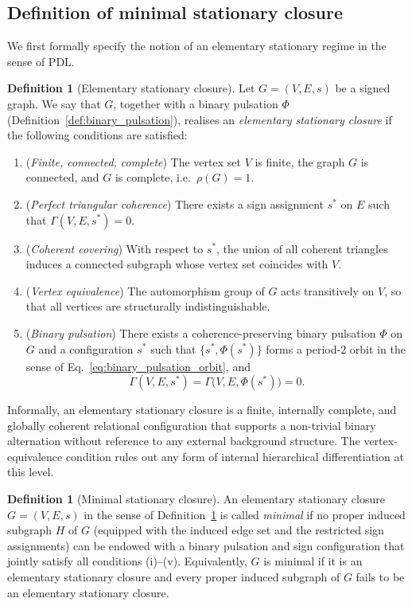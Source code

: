 \documentclass[11pt,a4paper]{article}
\theoremstyle{definition}
\newtheorem{definition}[theorem]{Definition}
\begin{document}
\subsection{Definition of minimal stationary closure}

We first formally specify the notion of an elementary stationary regime in the sense of PDL.\cite{PDL_Intro_2026,PDL_Main_2026,PDL_TO_Dialogue_2026}

\begin{definition}[Elementary stationary closure]
\label{def:stationary_closure}
Let $G=(V,E,s)$ be a signed graph. We say that $G$, together with a binary pulsation $\Phi$ (Definition~\ref{def:binary_pulsation}), realises an \emph{elementary stationary closure} if the following conditions are satisfied:
\begin{enumerate}
  \item[(i)] (\emph{Finite, connected, complete}) The vertex set $V$ is finite, the graph $G$ is connected, and $G$ is complete, i.e.\ $\rho(G)=1$.
  \item[(ii)] (\emph{Perfect triangular coherence}) There exists a sign assignment $s^\ast$ on $E$ such that $\Gamma(V,E,s^\ast)=0$.
  \item[(iii)] (\emph{Coherent covering}) With respect to $s^\ast$, the union of all coherent triangles induces a connected subgraph whose vertex set coincides with $V$.
  \item[(iv)] (\emph{Vertex equivalence}) The automorphism group of $G$ acts transitively on $V$, so that all vertices are structurally indistinguishable.
  \item[(v)] (\emph{Binary pulsation}) There exists a coherence-preserving binary pulsation $\Phi$ on $G$ and a configuration $s^\ast$ such that $\{s^\ast,\Phi(s^\ast)\}$ forms a period-$2$ orbit in the sense of Eq.~\eqref{eq:binary_pulsation_orbit}, and
  \[
    \Gamma(V,E,s^\ast) = \Gamma\bigl(V,E,\Phi(s^\ast)\bigr) = 0.
  \]
\end{enumerate}
\end{definition}

Informally, an elementary stationary closure is a finite, internally complete, and globally coherent relational configuration that supports a non-trivial binary alternation without reference to any external background structure.\cite{PDL_Intro_2026,PDL_Main_2026} The vertex-equivalence condition rules out any form of internal hierarchical differentiation at this level.

\begin{definition}[Minimal stationary closure]
\label{def:minimal_stationary_closure}
An elementary stationary closure $G=(V,E,s)$ in the sense of Definition~\ref{def:stationary_closure} is called \emph{minimal} if no proper induced subgraph $H$ of $G$ (equipped with the induced edge set and the restricted sign assignments) can be endowed with a binary pulsation and sign configuration that jointly satisfy all conditions (i)--(v). Equivalently, $G$ is minimal if it is an elementary stationary closure and every proper induced subgraph of $G$ fails to be an elementary stationary closure.
\end{definition}
\end{document}
